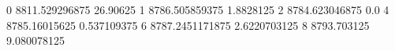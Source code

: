 0 8811.529296875 26.90625
1 8786.505859375 1.8828125
2 8784.623046875 0.0
4 8785.16015625 0.537109375
6 8787.2451171875 2.6220703125
8 8793.703125 9.080078125
